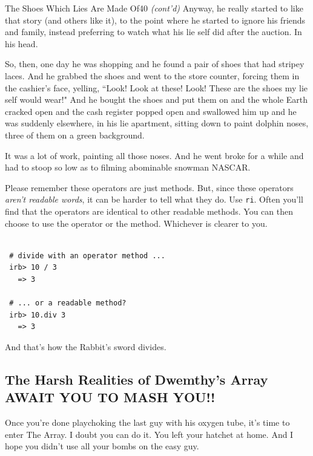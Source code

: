 \documentclass[10pt,twoside]{report}
\begin{document}
	\begin{sidebar}{The Shoes Which Lies Are Made Of}{40}
		\textit{(cont'd)} Anyway, he really started to like that story (and others like it), to the point where he started to ignore his friends and family, instead preferring to watch what his lie self did after the auction. In his head.\vspace{6pt}
		
		So, then, one day he was shopping and he found a pair of shoes that had stripey laces. And he grabbed the shoes and went to the store counter, forcing them in the cashier's face, yelling, ``Look! Look at these! Look! These are the shoes my lie self would wear!" And he bought the shoes and put them on and the whole Earth cracked open and the cash register popped open and swallowed him up and he was suddenly elsewhere, in his lie apartment, sitting down to paint dolphin noses, three of them on a green background.\vspace{6pt}

		It was a lot of work, painting all those noses. And he went broke for a while and had to stoop so low as to filming abominable snowman NASCAR.
	\end{sidebar}

Please remember these operators are just methods.  But, since these
operators {\em aren't readable words}, it can be harder to tell what
they do.  Use \lstinline[breaklines=true]|ri|.  Often you'll find that
the operators are identical to other readable methods.  You can then
choose to use the operator or the method. Whichever is clearer to you.


\begin{lstlisting}

 # divide with an operator method ...
 irb> 10 / 3
   => 3

 # ... or a readable method?
 irb> 10.div 3
   => 3

\end{lstlisting}


And that's how the Rabbit's sword divides.



\subsection{The Harsh Realities of Dwemthy's Array AWAIT YOU TO MASH YOU!!}



Once you're done playchoking the last guy with his oxygen tube, it's
time to enter The Array.  I doubt you can do it.  You left your
hatchet at home.  And I hope you didn't use all your bombs on the easy
guy.
\end{document}
